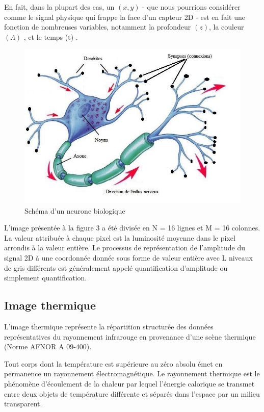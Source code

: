 \documentclass[12pt]{article}
\begin{document}
En fait, dans la plupart des cas, un $(x, y)$ - que nous pourrions considérer comme le signal physique qui frappe la face d’un capteur 2D - est en fait une fonction de nombreuses variables, notamment la profondeur $(z)$, la couleur $(\Lambda)$ ,  et le temps (t) \cite{13}.
\begin{figure}[h]
\centering
\includegraphics[scale=1]{img-Chapiter-1/neurone.jpeg}
\caption{Schéma d’un neurone biologique}
\end{figure}

L'image présentée à la figure 3 a été divisée en N = 16 lignes et M = 16 colonnes. La valeur attribuée à chaque pixel est la luminosité moyenne dans le pixel arrondis à la valeur entière. Le processus de représentation de l'amplitude du signal 2D à une coordonnée donnée sous forme de valeur entière avec L niveaux de gris différents est généralement appelé quantification d'amplitude ou simplement quantification.
\subsection{Image thermique}
L'image thermique représente la répartition structurée des données représentatives du rayonnement infrarouge en provenance d'une scène thermique (Norme AFNOR A 09-400).

Tout corps dont la température est supérieure au zéro absolu émet en permanence un rayonnement électromagnétique. Le rayonnement thermique est le phénomène d'écoulement de la chaleur par lequel l'énergie calorique se transmet entre deux objets de température différente et séparés dans l'espace par un milieu transparent.
\end{document}
